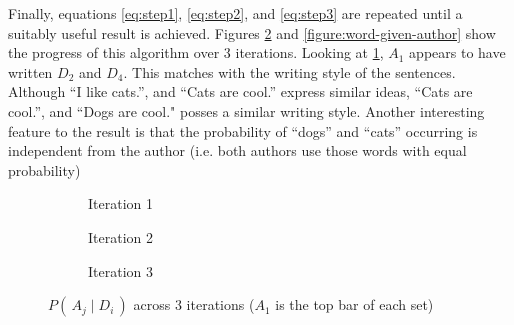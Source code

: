 Finally, equations \ref{eq:step1}, \ref{eq:step2}, and \ref{eq:step3} are repeated until a suitably useful result is achieved.  Figures \ref{figure:author-given-document} and \ref{figure:word-given-author} show the progress of this algorithm over 3 iterations.  Looking at \ref{figure:author-given-document3}, $A_1$ appears to have written $D_2$ and $D_4$.  This matches with the writing style of the sentences.  Although ``I like cats.'', and ``Cats are cool.'' express similar ideas, ``Cats are cool.'', and ``Dogs are cool." posses a similar writing style.  Another interesting feature to the result is that the probability of ``dogs'' and ``cats'' occurring is independent from the author (i.e. both authors use those words with equal probability)

\begin{figure}
\centering
\begin{subfigure}{0.3\textwidth}
	\centering
	\begin{bchart}[step=0.5,max=1.0,width=3cm]
		\smallskip
		\smallskip
		\smallskip
	\end{bchart}
	\caption{Iteration 1}
\end{subfigure}%
\begin{subfigure}{0.3\textwidth}
	\centering
	\begin{bchart}[step=0.5,max=1.0,width=3cm]
		\smallskip
		\smallskip
		\smallskip
	\end{bchart}
	\caption{Iteration 2}
\end{subfigure}%
\begin{subfigure}{0.3\textwidth}
	\centering
	\begin{bchart}[step=0.5,max=1.0,width=3cm]
		\smallskip
		\smallskip
		\smallskip
	\end{bchart}
	\caption{Iteration 3}
	\label{figure:author-given-document3}
\end{subfigure}
\caption{$P(\,A_j \mid D_i\,)$ across 3 iterations ($A_1$ is the top bar of each set)}
\label{figure:author-given-document}
\end{figure}

